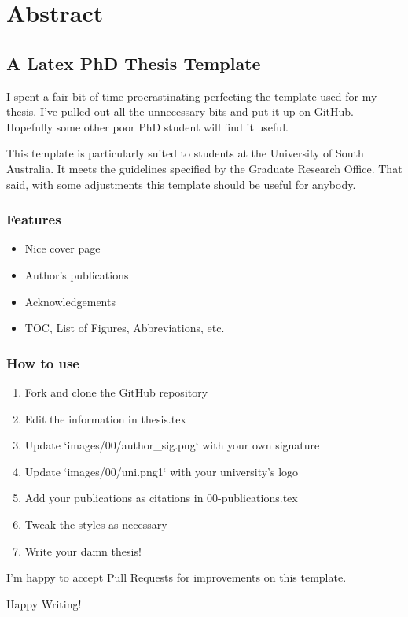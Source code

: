 

\newpage
\thispagestyle{plain}
\chapter*{Abstract}


\section{A Latex PhD Thesis Template}

I spent a fair bit of time procrastinating perfecting the template used for my
thesis. I've pulled out all the unnecessary bits and put it up on GitHub.
Hopefully some other poor PhD student will find it useful.

This template is particularly suited to students at the University of South
Australia. It meets the guidelines specified by the Graduate Research Office.
That said, with some adjustments this template should be useful for anybody.

\subsection{Features}

\begin{itemize}
 \item Nice cover page
 \item Author's publications
 \item Acknowledgements
 \item TOC, List of Figures, Abbreviations, etc.
\end{itemize}

\subsection{How to use}

\begin{enumerate}
    \item Fork and clone the GitHub repository
    \item Edit the information in thesis.tex
    \item Update `images/00/author_sig.png` with your own signature
    \item Update `images/00/uni.png1` with your university's logo
    \item Add your publications as citations in 00-publications.tex
    \item Tweak the styles as necessary
    \item Write your damn thesis!
\end{enumerate}

I'm happy to accept Pull Requests for improvements on this template.

Happy Writing!

\clearpage
